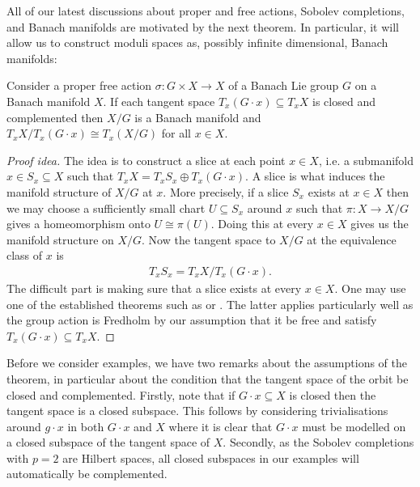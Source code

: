 \documentclass[12pt]{ociamthesis}  %
\begin{document}
All of our latest discussions about proper and free actions, Sobolev
completions, and Banach manifolds are motivated by the next theorem.
In particular, it will allow us to construct moduli spaces as, possibly
infinite dimensional, Banach manifolds:

\begin{theorem}\label{thm:banach_quotient}
  Consider a proper free action $\sigma : G\times X\to X$ of a Banach
  Lie group $G$ on a Banach manifold $X$. If each tangent space
  $T_x(G\cdot x) \subseteq T_x X$ is closed and complemented then
  $X/G$ is a Banach manifold and $T_x X/T_x (G\cdot x) \cong T_x(X/G)$
  for all $x\in X$.
  \begin{proof}[Proof idea]
    The idea is to construct a slice at each point $x\in X$, i.e. a submanifold
    $x\in S_x\subseteq X$ such that $T_x X = T_xS_x \oplus T_x(G\cdot x)$. A slice is
    what induces the manifold structure of $X/G$ at $x$. More precisely, if a slice
    $S_x$ exists at $x\in X$ then we may choose a sufficiently small chart $U\subseteq S_x$
    around $x$ such that $\pi : X \to X/G$ gives a homeomorphism onto $U\cong\pi(U)$. Doing this
    at every $x\in X$ gives us the manifold structure on $X/G$. Now the tangent space
    to $X/G$ at the equivalence class of $x$ is
    \begin{align}\label{eq:banach_quotient_tangent}
      T_x S_x = T_x X / T_x (G\cdot x).
    \end{align}
    The difficult part is making sure that a slice exists at every $x\in X$. One may use
    one of the established theorems such as \cite[Theorem 3.28]{diez2019}
    or \cite[Theorem 5.2.6]{palais1992}. The latter applies particularly well
    as the group action is Fredholm by our assumption that it be free and satisfy
    $T_x(G\cdot x)\subseteq T_x X$.
  \end{proof}
\end{theorem}

Before we consider examples, we have two remarks about the assumptions of the theorem,
in particular about the condition that the tangent space of the orbit be closed and
complemented. Firstly, note that if $G\cdot x \subseteq X$ is closed then the tangent
space is a closed subspace. This follows by considering trivialisations around $g\cdot x$
in both $G\cdot x$ and $X$ where it is clear that $G\cdot x$ must be modelled on a closed
subspace of the tangent space of $X$. Secondly, as the Sobolev completions with $p=2$ are
Hilbert spaces, all closed subspaces in our examples will automatically be complemented.
\end{document}

